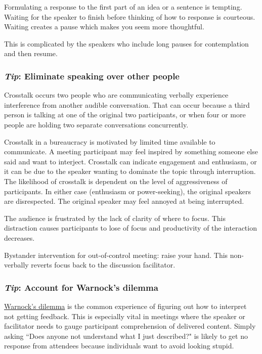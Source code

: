 Formulating a response to the first part of an idea or a sentence is tempting. Waiting for the speaker to finish before thinking of how to response is courteous. Waiting creates a pause which makes you seem more thoughtful. 

This is complicated by the speakers who include long pauses for contemplation and then resume. 

\subsubsection*{\textit{Tip}: Eliminate speaking over other people\label{sec:crosstalk}}

Crosstalk occurs two people who are communicating verbally experience interference from another audible conversation. That can occur because a third person is talking at one of the original two participants, or when four or more people are holding two separate conversations concurrently. 

Crosstalk in a bureaucracy is motivated by
limited time available to communicate. A meeting participant may feel inspired by something someone else said and want to interject. 
Crosstalk can indicate engagement and enthusiasm, or it can be due to the speaker wanting to dominate the topic through interruption. The likelihood of crosstalk is dependent on the level of aggressiveness of participants.
In either case (enthusiasm or power-seeking), the original speakers are disrespected. The original speaker may feel annoyed at being interrupted.



The audience is frustrated by the lack of clarity of where to focus. This distraction causes participants to lose of focus and productivity of the interaction decreases.

Bystander intervention for out-of-control meeting: raise your hand. 
This non-verbally reverts focus back to the discussion facilitator. 

\subsubsection*{\textit{Tip}: Account for Warnock's dilemma}
\href{https://en.wikipedia.org/wiki/Warnock\%27s_dilemma}{Warnock's dilemma}
is the common experience of figuring out how to interpret not getting feedback. This is especially vital in meetings where the speaker or facilitator needs to gauge participant comprehension of delivered content. Simply asking ``Does anyone not understand what I just described?" is likely to get no response from attendees because individuals want to avoid looking stupid.

